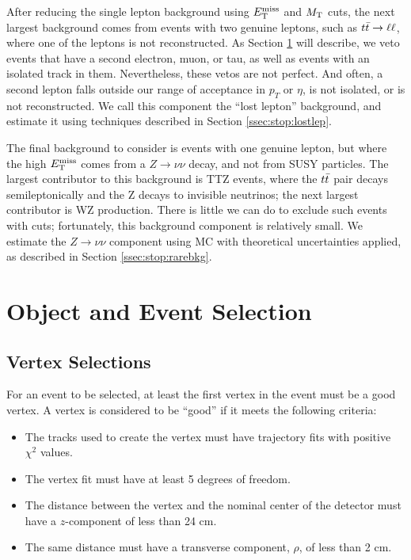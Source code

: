 
After reducing the single lepton background using $E_\text{T}^\text{miss}$ and $M_\text{T}$ cuts,
the next largest background comes from events with two genuine
leptons, such as $t\bar{t} \rightarrow \ell\ell$, where one of the leptons is not
reconstructed. As Section \ref{sec:stop:selections} will describe, we
veto events that have a second electron, muon, or tau, as well as
events with an isolated track in them. Nevertheless, these vetos are
not perfect. And often, a second lepton falls outside our range of
acceptance in $p_T$ or $\eta$, is not isolated, or is not
reconstructed. We call this component the ``lost lepton'' background,
and estimate it using techniques described in Section
\ref{ssec:stop:lostlep}.

The final background to consider is events with one genuine lepton,
but where the high $E_\text{T}^\text{miss}$ comes from a $Z \rightarrow \nu\nu$ decay,
and not from SUSY particles. The largest contributor to this
background is TTZ events, where the $t\bar{t}$ pair decays
semileptonically and the Z decays to invisible neutrinos; the next
largest contributor is WZ production. There is little we can do to
exclude such events with cuts; fortunately, this background component
is relatively small. We estimate the $Z \rightarrow \nu\nu$
component using MC with theoretical uncertainties applied, as
described in Section \ref{ssec:stop:rarebkg}.

\section{Object and Event Selection}
\label{sec:stop:selections}


\subsection{Vertex Selections}
\label{ssec:stop:vtxselections}

For an event to be selected, at least the first vertex in the event
must be a good vertex. A vertex is considered to be ``good'' if it
meets the following criteria:

\begin{itemize}
\item The tracks used to create the vertex must have trajectory fits
  with positive $\chi^2$ values.
\item The vertex fit must have at least 5 degrees of freedom.
\item The distance between the vertex and the nominal center of the
  detector must have a $z$-component of less than 24 cm.
\item The same distance must have a transverse component, $\rho$, of
  less than 2 cm.
\end{itemize}

